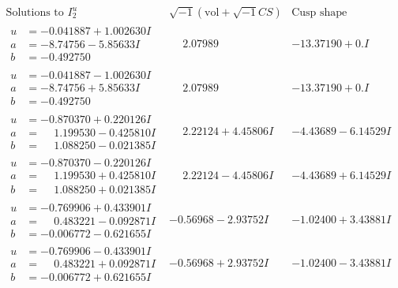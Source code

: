 \documentclass[1p]{elsarticle_modified}
\theoremstyle{definition}
\newcommand{\I}{\sqrt{-1}}
\begin{document}
$$\begin{array}{c|c|c}  
\text{Solutions to }I^u_{2}& \I (\text{vol} + \sqrt{-1}CS) & \text{Cusp shape}\\
 \hline 
\begin{aligned}
u &= -0.041887 + 1.002630 I \\
a &= -8.74756 - 5.85633 I \\
b &= -0.492750\phantom{ +0.000000I}\end{aligned}
 & \phantom{-}2.07989\phantom{ +0.000000I} & -13.37190 + 0. I\phantom{ +0.000000I} \\ \hline\begin{aligned}
u &= -0.041887 - 1.002630 I \\
a &= -8.74756 + 5.85633 I \\
b &= -0.492750\phantom{ +0.000000I}\end{aligned}
 & \phantom{-}2.07989\phantom{ +0.000000I} & -13.37190 + 0. I\phantom{ +0.000000I} \\ \hline\begin{aligned}
u &= -0.870370 + 0.220126 I \\
a &= \phantom{-}1.199530 - 0.425810 I \\
b &= \phantom{-}1.088250 - 0.021385 I\end{aligned}
 & \phantom{-}2.22124 + 4.45806 I & -4.43689 - 6.14529 I \\ \hline\begin{aligned}
u &= -0.870370 - 0.220126 I \\
a &= \phantom{-}1.199530 + 0.425810 I \\
b &= \phantom{-}1.088250 + 0.021385 I\end{aligned}
 & \phantom{-}2.22124 - 4.45806 I & -4.43689 + 6.14529 I \\ \hline\begin{aligned}
u &= -0.769906 + 0.433901 I \\
a &= \phantom{-}0.483221 - 0.092871 I \\
b &= -0.006772 - 0.621655 I\end{aligned}
 & -0.56968 - 2.93752 I & -1.02400 + 3.43881 I \\ \hline\begin{aligned}
u &= -0.769906 - 0.433901 I \\
a &= \phantom{-}0.483221 + 0.092871 I \\
b &= -0.006772 + 0.621655 I\end{aligned}
 & -0.56968 + 2.93752 I & -1.02400 - 3.43881 I \\ \hline\begin{aligned}

\end{aligned}
\end{array}$$
\end{document}
